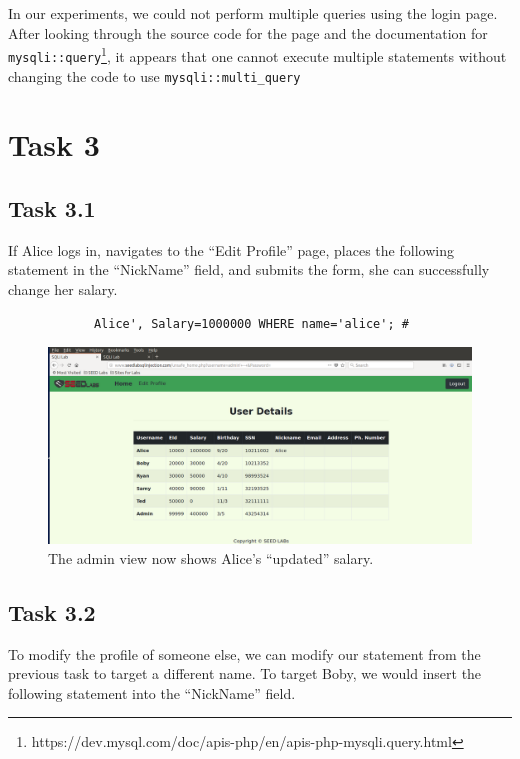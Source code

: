 \documentclass[12pt,letterpaper]{article}
\begin{document}
			In our experiments, we could not perform multiple queries using the login page. After looking through the source code for the page and the documentation for \texttt{mysqli::query}\footnote{https://dev.mysql.com/doc/apis-php/en/apis-php-mysqli.query.html}, it appears that one cannot execute multiple statements without changing the code to use \texttt{mysqli::multi\_query}
			
	\pagebreak
			
	\section*{Task 3}
		\subsection*{Task 3.1}
			If Alice logs in, navigates to the ``Edit Profile'' page, places the following statement in the ``NickName'' field, and submits the form, she can successfully change her salary.
			
			\begin{verbatim}
			Alice', Salary=1000000 WHERE name='alice'; #
			\end{verbatim}
			
			\begin{figure}[h!]
				\includegraphics[width=\linewidth]{task-3-1-admin}
				\caption{The admin view now shows Alice's ``updated'' salary.}
			\end{figure}
		
		\subsection*{Task 3.2}
			To modify the profile of someone else, we can modify our statement from the previous task to target a different name. To target Boby, we would insert the following statement into the ``NickName'' field.
			
\end{document}
